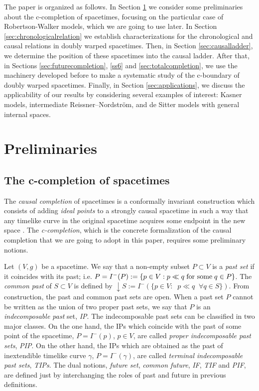 The paper is organized as follows. In Section \ref{sec:preliminaries} we consider some preliminaries about the c-completion of spacetimes, focusing on the particular case of Robertson-Walker models, which we are going to use later. In Section \ref{sec:chronologicalrelation} we establish characterizations for the chronological and causal relations in doubly warped spacetimes. Then, in Section \ref{sec:causalladder}, we determine the position of these spacetimes into the causal ladder.
After that, in Sections \ref{sec:futurecompletion}, \ref{ss6} and \ref{sec:totalcompletion}, we use the machinery developed before to make a systematic study of the c-boundary of doubly warped spacetimes.
Finally, in Section \ref{sec:applications}, we discuss the applicability of our results by considering several examples of interest: Kasner models, intermediate Reissner--Nordstr\"om, and de Sitter models with general internal spaces.

\section{Preliminaries}
\label{sec:preliminaries}
\subsection{The c-completion of spacetimes}
The {\em causal completion} of spacetimes is a conformally invariant construction which consists of adding {\em
ideal points} to a strongly causal spacetime in such a way that any timelike
curve in the original spacetime acquires some endpoint in the new
space \cite{GKP}. The {\em c-completion}, which is the concrete formalization of the causal completion that we are going to adopt in this paper, requires some preliminary notions.

Let $(V,g)$ be a spacetime. We say that a non-empty
subset $P\subset V$ is a {\em past set} if it coincides
with its past; i.e. $P=I^{-}(P):=\{p\in V: p\ll q\;\hbox{for
some}\; q\in P\}$. The {\em common past} of $S\subset V$ is
defined by $\downarrow S:=I^{-}(\{p\in V:\;\; p\ll q\;\;\forall
q\in S\})$. From construction, the past and common past sets are
open. When a past set $P$ cannot be written as the union of two proper
past sets, we say that $P$
is an {\em indecomposable past} set, {\em IP}. The indecomposable past sets can be classified in two major classes. On the one hand, the IPs which
coincide with the past of some point of the spacetime,
$P=I^{-}(p)$, $p\in V$, are called {\em proper indecomposable past
  sets}, {\em PIP}. On the other hand, the IPs which are obtained as the past of inextendible timelike curve $\gamma$, $P=I^-(\gamma)$, are called {\em terminal indecomposable past sets}, {\em TIPs}. The dual
notions, {\em future set}, {\em common future}, {\em IF}, {\em
TIF} and {\em PIF}, are defined just by interchanging the roles of
past and future in previous definitions.

